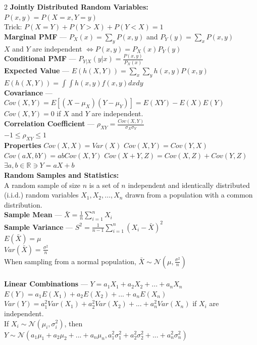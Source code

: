 \documentclass[10pt,letterpaper]{article}
\begin{document}
\begin{multicols}{2}
\textbf{Jointly Distributed Random Variables:}\\
$P(x, y) = P(X = x, Y = y)$\\
Trick: $P(X=Y) + P(Y > X) + P(Y < X) = 1$\\
\textbf{Marginal PMF} --- $P_X(x) = \sum_y P(x, y)$ and $P_Y(y) = \sum_x P(x, y)$\\
$X$ and $Y$ are independent $\iff P(x, y) = P_X(x)P_Y(y)$\\
\textbf{Conditional PMF} --- $P_{Y|X}(y|x) = \frac{P(x, y)}{P_X(x)}$\\
\textbf{Expected Value} --- $E(h(X,Y)) = \sum_x \sum_y h(x,y) P(x,y)$\\
$E(h(X,Y)) = \int \int h(x,y) f(x,y) dx dy$\\
\textbf{Covariance} --- $Cov(X,Y) = E[(X - \mu_X)(Y - \mu_Y)] = E(XY) - E(X)E(Y)$\\
$Cov(X,Y) = 0$ if \( X \) and \( Y \) are independent.\\
\textbf{Correlation Coefficient} --- $\rho_{XY} = \frac{Cov(X,Y)}{\sigma_X \sigma_Y}$\\
$-1 \leq \rho_{XY} \leq 1$\\
\textbf{Properties} $Cov(X,X) = Var(X)$ $Cov(X,Y) = Cov(Y,X)$ $Cov(aX,bY) = abCov(X,Y)$
$Cov(X + Y, Z) = Cov(X,Z) + Cov(Y,Z)$ $\exists a,b \in \mathbb{R} \ni Y = aX + b$\\

\textbf{Random Samples and Statistics:}\\
A random sample of size \( n \) is a set of \( n \) independent and identically distributed (i.i.d.) random variables \( X_1, X_2, \ldots, X_n \) drawn from a population with a common distribution.\\
\textbf{Sample Mean} --- $\bar{X} = \frac{1}{n} \sum_{i=1}^n X_i$\\
\textbf{Sample Variance} --- $S^2 = \frac{1}{n-1} \sum_{i=1}^n (X_i - \bar{X})^2$\\
$E(\bar{X}) = \mu$\\
$Var(\bar{X}) = \frac{\sigma^2}{n}$\\
When sampling from a normal population, $\bar{X} \sim \mathcal{N}(\mu, \frac{\sigma^2}{n})$\\
\\
\textbf{Linear Combinations} --- $Y = a_1X_1 + a_2X_2 + ... + a_nX_n$\\
$E(Y) = a_1E(X_1) + a_2E(X_2) + ... + a_nE(X_n)$\\
$Var(Y) = a_1^2Var(X_1) + a_2^2Var(X_2) + ... + a_n^2Var(X_n)$ if \( X_i \) are independent.\\
If \( X_i \sim \mathcal{N}(\mu_i, \sigma_i^2) \), then $Y \sim \mathcal{N}(a_1\mu_1 + a_2\mu_2 + ... + a_n\mu_n, a_1^2\sigma_1^2 + a_2^2\sigma_2^2 + ... + a_n^2\sigma_n^2)$\\
\\

\vspace{9999pt}

\end{multicols}
\end{document}
